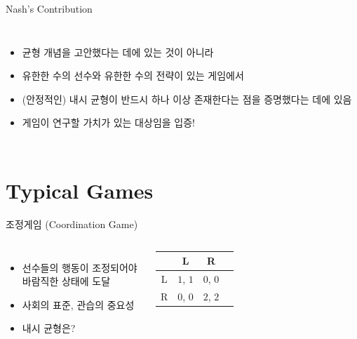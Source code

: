 \documentclass[final]{beamer}
\begin{document}
\begin{frame}[t]{Nash's Contribution}
	\begin{columns}[c]
	\column{18em}
	\begin{itemize}
		\item 균형 개념을 고안했다는 데에 있는 것이 아니라
		\item 유한한 수의 선수와 유한한 수의 전략이 있는 게임에서 
		\item (안정적인) 내시 균형이 반드시 하나 이상 존재한다는 점을 증명했다는 데에 있음
		\item 게임이 연구할 가치가 있는 대상임을 입증! 
	\end{itemize}
	\column{13em}
	\end{columns}
\end{frame}


\section{Typical Games} %
\label{sec:typical_games}

\begin{frame}[t]{조정게임 (Coordination Game)}
	\begin{columns}[c]
		\column{18em}
		\begin{itemize}
			\item 선수들의 행동이 조정되어야 바람직한 상태에 도달 
			\item 사회의 표준, 관습의 중요성  
			\item 내시 균형은? 
		\end{itemize}
		\column{15em}
		\begin{table}
		\setlength{\tabcolsep}{1.2em}
		\begin{tabular}{|c|c|c|c|} \hline
		& {L} &  {R}\\ \hline
		{L} & {$1$}, {$1$} & {$0$}, {$0$} \\ \hline%
		{R} & {$0$}, {$0$}  & {$2$}, {$2$}\\ 
		\hline
		\end{tabular}
		\end{table}
	\end{columns}
\end{frame}
\end{document}
